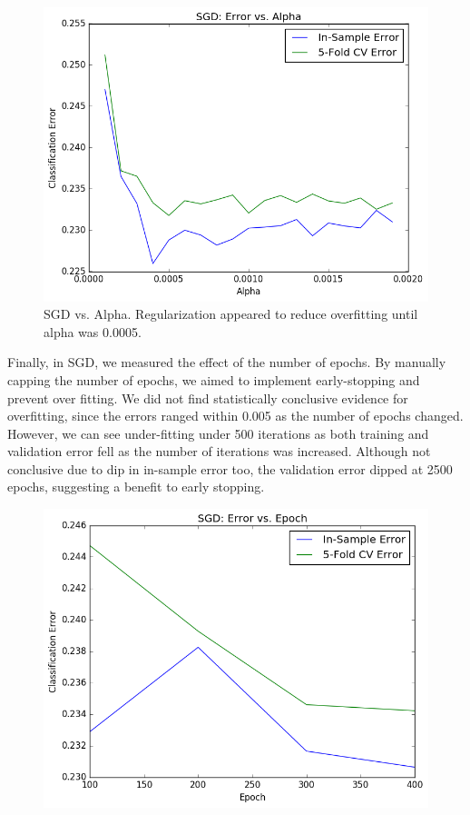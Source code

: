 \begin{itemize}
\begin{itemize}
\begin{figure}[H]
\includegraphics[scale=0.35]{sgd-vs-alpha2}
\caption{SGD vs. Alpha. Regularization appeared to reduce overfitting until alpha was 0.0005.}
\end{figure}
Finally, in SGD, we measured the effect of the number of epochs. By manually capping the number of epochs, we aimed to implement early-stopping and prevent over fitting. We did not find statistically conclusive evidence for overfitting, since the errors ranged within 0.005 as the number of epochs changed. However, we can see under-fitting under 500 iterations as both training and validation error fell as the number of iterations was increased. Although not conclusive due to dip in in-sample error too, the validation error dipped at 2500 epochs, suggesting a benefit to early stopping.
\begin{figure}[H]
\centering
\includegraphics[scale=0.25]{sgd-vs-epoch2}

\end{figure}
\end{itemize}
\end{itemize}

